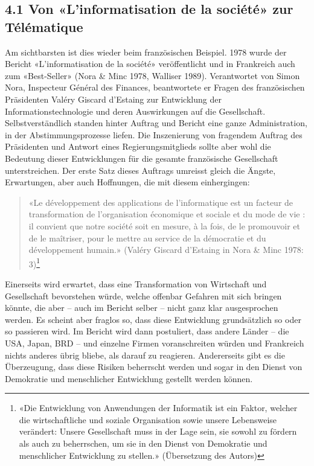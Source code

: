 \documentclass[a4paper,
fontsize=11pt,
oneside,
numbers=noperiodatend,
parskip=half-,
bibliography=totoc,
final
]{scrartcl}
\begin{document}
\hypertarget{von-linformatisation-de-la-sociuxe9tuxe9-zur-tuxe9luxe9matique}{%
\subsection{4.1 Von «L'informatisation de la société» zur
Télématique}\label{von-linformatisation-de-la-sociuxe9tuxe9-zur-tuxe9luxe9matique}}

Am sichtbarsten ist dies wieder beim französischen Beispiel. 1978 wurde
der Bericht «L'informa\-tisation de la société» veröffentlicht und in
Frankreich auch zum «Best-Seller» (Nora \& Minc 1978, Walliser 1989).
Verantwortet von Simon Nora, Inspecteur Général des Finances,
beantwortete er Fragen des französischen Präsidenten Valéry Giscard
d'Estaing zur Entwicklung der Informationstechnologie und deren
Auswirkungen auf die Gesellschaft. Selbstverständlich standen hinter
Auftrag und Bericht eine ganze Administration, in der
Abstimmungsprozesse liefen. Die Inszenierung von fragendem Auftrag des
Präsidenten und Antwort eines Regierungsmitglieds sollte aber wohl die
Bedeutung dieser Entwicklungen für die gesamte französische Gesellschaft
unterstreichen. Der erste Satz dieses Auftrags umreisst gleich die
Ängste, Erwartungen, aber auch Hoffnungen, die mit diesem einhergingen:

\begin{quote}
«Le développement des applications de l'informatique est un facteur de
transformation de l'organisation économique et sociale et du mode de vie
: il convient que notre société soit en mesure, à la fois, de le
promouvoir et de le maîtriser, pour le mettre au service de la
démocratie et du développement humain.» (Valéry Giscard d'Estaing in
Nora \& Minc 1978: 3)\footnote{«Die Entwicklung von Anwendungen der
  Informatik ist ein Faktor, welcher die wirtschaftliche und soziale
  Organisation sowie unsere Lebensweise verändert: Unsere Gesellschaft
  muss in der Lage sein, sie sowohl zu fördern als auch zu beherrschen,
  um sie in den Dienst von Demokratie und menschlicher Entwicklung zu
  stellen.» (Übersetzung des Autors)}
\end{quote}

Einerseits wird erwartet, dass eine Transformation von Wirtschaft und
Gesellschaft bevorstehen würde, welche offenbar Gefahren mit sich
bringen könnte, die aber -- auch im Bericht selber -- nicht ganz klar
ausgesprochen werden. Es scheint aber fraglos so, dass diese Entwicklung
grundsätzlich so oder so passieren wird. Im Bericht wird dann
postuliert, dass andere Länder -- die USA, Japan, BRD -- und einzelne
Firmen voranschreiten würden und Frankreich nichts anderes übrig bliebe,
als darauf zu reagieren. Andererseits gibt es die Überzeugung, dass
diese Risiken beherrscht werden und sogar in den Dienst von Demokratie
und menschlicher Entwicklung gestellt werden können.
\end{document}
